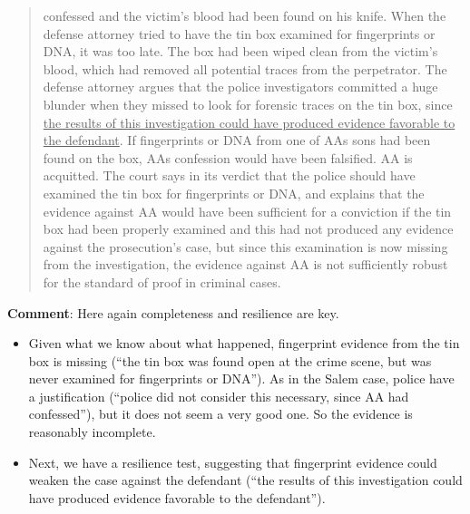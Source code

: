 \documentclass[
  10pt,
  dvipsnames,enabledeprecatedfontcommands]{scrartcl}
\providecommand{\tightlist}{%
  \setlength{\itemsep}{0pt}\setlength{\parskip}{0pt}}
\begin{document}
\begin{quote}
{confessed} and the victim’s blood had been found on his knife. When the defense attorney
tried to have the tin box examined for fingerprints or DNA, it was too late. The box had been
wiped clean from the victim’s blood, which had removed all potential traces from the
perpetrator. The defense attorney argues that the police investigators committed a huge
blunder when they missed to look for forensic traces on the tin box, since \underline{the results of this
investigation could have produced evidence favorable to the defendant}. If fingerprints or DNA
from one of AAs sons had been found on the box, AAs confession would have been falsified.
AA is acquitted. The court says in its verdict that the police should have examined the tin box
for fingerprints or DNA, and explains that the evidence against AA would have been sufficient
for a conviction if the tin box had been properly examined and this had not produced any
evidence against the prosecution’s case, but since this examination is now missing from the
investigation, the evidence against AA is not sufficiently robust for the standard of proof in
criminal cases.
\end{quote}


\textbf{Comment}: Here again completeness and resilience are key.

\begin{itemize}
\tightlist
\item
  Given what we know about what happened, fingerprint evidence from the
  tin box is missing (``the tin box was found open at the crime scene,
  but was never examined for fingerprints or DNA''). As in the Salem
  case, police have a justification (``police did not consider this
  necessary, since AA had confessed''), but it does not seem a very good
  one. So the evidence is reasonably incomplete.
\end{itemize}



\begin{itemize}
\tightlist
\item
  Next, we have a resilience test, suggesting that fingerprint evidence
  could weaken the case against the defendant (``the results of this
  investigation could have produced evidence favorable to the
  defendant'').
\end{itemize}
\end{document}
